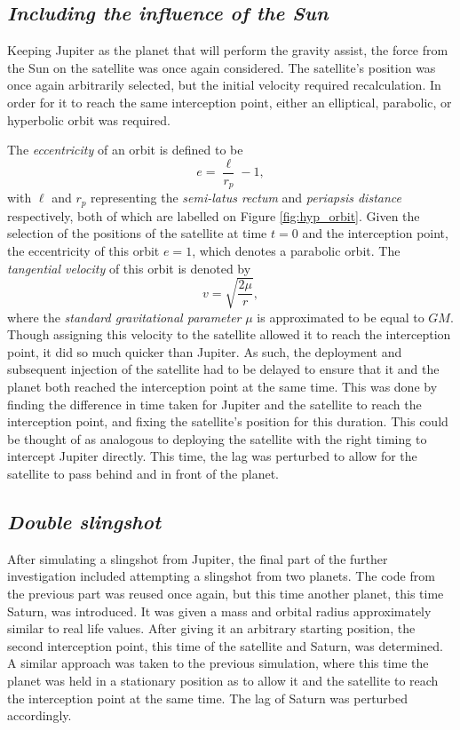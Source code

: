 \documentclass[11pt, english]{report}
\begin{document}
\subsection{\textsl{Including the influence of the Sun}}
\normalsize{\noindent Keeping Jupiter as the planet that will perform the gravity assist, the force from the Sun on the satellite was once again considered. The satellite's position was once again arbitrarily selected, but the initial velocity required recalculation. In order for it to reach the same interception point, either an elliptical, parabolic, or hyperbolic orbit was required.

The \emph{eccentricity} of an orbit \cite{kluever_spaceflight_2003} is defined to be
\begin{equation}
    e = \frac{\ell}{r_p} - 1,
\end{equation}
\noindent with $\ell$ and $r_p$ representing the \emph{semi-latus rectum} and \emph{periapsis distance} respectively, both of which are labelled on Figure \ref{fig:hyp_orbit}. Given the selection of the positions of the satellite at time $t=0$ and the interception point, the eccentricity of this orbit $e=1$, which denotes a parabolic orbit. The \emph{tangential velocity} of this orbit is denoted by 
\begin{equation}
    v = \sqrt{\frac{2\mu}{r}},
\end{equation}
\noindent where the \emph{standard gravitational parameter} $\mu$ is approximated to be equal to $GM$. Though assigning this velocity to the satellite allowed it to reach the interception point, it did so much quicker than Jupiter. As such, the deployment and subsequent injection of the satellite had to be delayed to ensure that it and the planet both reached the interception point at the same time. This was done by finding the difference in time taken for Jupiter and the satellite to reach the interception point, and fixing the satellite's position for this duration. This could be thought of as analogous to deploying the satellite with the right timing to intercept Jupiter directly. This time, the lag was perturbed to allow for the satellite to pass behind and in front of the planet.
}

\subsection{\textsl{Double slingshot}}
\normalsize{\noindent After simulating a slingshot from Jupiter, the final part of the further investigation included attempting a slingshot from two planets. The code from the previous part was reused once again, but this time another planet, this time Saturn, was introduced. It was given a mass and orbital radius approximately similar to real life values. After giving it an arbitrary starting position, the second interception point, this time of the satellite and Saturn, was determined. A similar approach was taken to the previous simulation, where this time the planet was held in a stationary position as to allow it and the satellite to reach the interception point at the same time. The lag of Saturn was perturbed accordingly.

}
\end{document}
